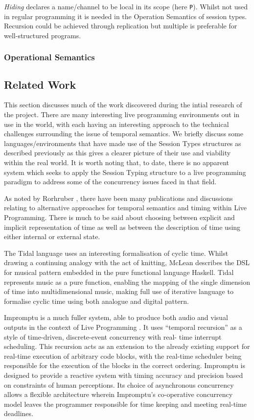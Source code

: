 \documentclass[11pt]{scrartcl}
\begin{document}
\emph{Hiding} declares a name/channel to be local in its scope (here 
\texttt{P}). Whilst not used in regular programming it is needed in the 
Operation Semantics of session types. Recursion could be achieved through 
replication but multiple is preferable for well-structured programs.

\subsubsection{Operational Semantics}


\subsection{Related Work}
This section discusses much of the work discovered during the intial research 
of the project. There are many interesting live programming environments out 
in use in the world, with each having an interesting approach to the technical 
challenges surrounding the issue of temporal semantics. We briefly discuss 
some languages/environments that have made use of the Session Types structures 
as described previously as this gives a clearer picture of their use and 
viability within the real world. It is worth noting that, to date, there is no 
apparent system which seeks to apply the Session Typing structure to a live 
programming paradigm to address some of the concurrency issues faced in that 
field.

As noted by Rorhruber \cite{BMNR14}, there have been many publications and 
discussions relating to alternative approaches for temporal semantics and 
timing within Live Programming. There is much to be said about choosing 
between explicit and implicit representation of time as well as between the 
description of time using either internal or external state.

The Tidal language \cite{McL13} uses an interesting formalisation of cyclic 
time. Whilst drawing a continuing analogy with the act of knitting, McLean 
describes the DSL for musical pattern embedded in the pure functional language 
Haskell. Tidal represents music as a pure function, enabling the mapping of 
the single dimension of time into multidimensional music, making full use of 
iterative language to formalise cyclic time using both analogue and digital 
pattern.

Impromptu is a much fuller system, able to produce both audio and visual 
outputs in the context of Live Programming \cite{SG10}. It uses ``temporal 
recursion'' as a style of time-driven, discrete-event concurrency with real-
time interrupt scheduling. This recursion acts as an extension to the already 
existing support for real-time execution of arbitrary code blocks, with the 
real-time scheduler being responsible for the execution of the blocks in the 
correct ordering. Impromptu is designed to provide a reactive system with 
timing accuracy and precision based on constraints of human perceptions. Its 
choice of asynchronous concurrency allows a flexible architecture wherein 
Impromptu's co-operative concurrency model leaves the programmer responsible 
for time keeping and meeting real-time deadlines.
\end{document}
